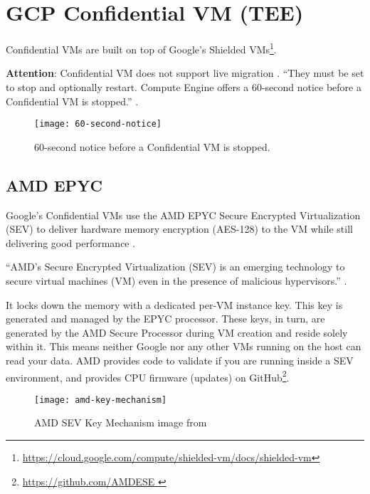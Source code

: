 
\section{GCP Confidential VM (TEE)}


Confidential VMs are built on top of 
Google's Shielded VMs\footnote{\url{https://cloud.google.com/compute/shielded-vm/docs/shielded-vm}}. 

\textbf{Attention}: Confidential VM does not support live migration 
\citep{google_creating_2022}. 
“They must be set to stop and optionally restart. 
Compute Engine offers a 60-second notice before a Confidential VM is stopped.” 
\citep{google_live_2022}.

\begin{figure}[!ht]
    \centering
    \texttt{[image: 60-second-notice]}
    \caption{60-second notice before a Confidential VM is stopped.}
    \label{fig:60-second-notice}
\end{figure}

\subsection{AMD EPYC} 
Google's Confidential VMs use the AMD EPYC Secure Encrypted Virtualization (SEV) 
to deliver hardware memory encryption (AES-128) to the VM 
while still delivering good performance \citep{amd_amd_2022, amd_secure_2019}. 

“AMD’s Secure Encrypted Virtualization (SEV) is an emerging technology to secure virtual machines (VM) 
even in the presence of malicious hypervisors.” \citep{li_exploiting_2019}.

It locks down the memory with a dedicated per-VM instance key. 
This key is generated and managed by the EPYC processor. 
These keys, in turn, are generated by the AMD Secure Processor during VM creation and reside solely within it.
This means neither Google nor any other VMs running on the host can read your data. 
AMD provides code to validate if you are running inside a SEV environment, 
and provides CPU firmware (updates) on GitHub\footnote{\url{https://github.com/AMDESE }}.

\begin{figure}[!ht]
    \centering
    \texttt{[image: amd-key-mechanism]}
    \caption{AMD SEV Key Mechanism image from \cite{amd_amd_2020}}
    \label{fig:amd-key-mechanism}
\end{figure}




